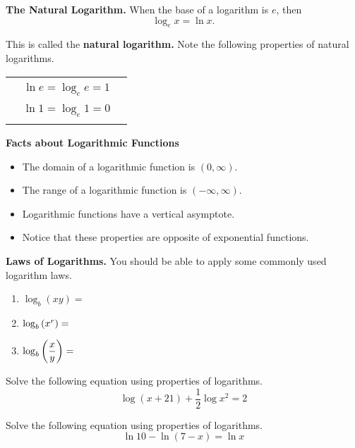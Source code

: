 \documentclass[12pt]{article}
\begin{document}
\textbf{The Natural Logarithm.} When the base of a logarithm is $e$, then
$$\log_e x=\ln x.$$

This is called the \textbf{natural logarithm.} Note the following properties of natural logarithms.

\begin{center}
\begin{tabular}{|ccc|}
\hline
& & \\
& $\ln e=\log_e e=1$ & \\
& & \\
& $\ln 1=\log_e 1=0$ & \\
& & \\
\hline
\end{tabular}
\end{center}


\vspace{5mm}

\textbf{Facts about Logarithmic Functions}
\begin{itemize}
	\item The domain of a logarithmic function is $(0,\infty)$. 
	\item The range of a logarithmic function is $(-\infty,\infty)$. 
	\item Logarithmic functions have a vertical asymptote.
	\item Notice that these properties are opposite of exponential functions.
\end{itemize}

\newpage 

\textbf{Laws of Logarithms.} You should be able to apply some commonly used logarithm laws.
\begin{enumerate}
	\item[\tc{1}] $\log_b(xy)=$
	\vspace{4mm}
	\item[\tc{2}] $\log_b\left( x^r\right)=$
	\vspace{2mm}
	\item[\tc{3}] $\log_b\displaystyle\left(\frac{x}{y}\right)=$
	\vspace{2mm}
\end{enumerate}

\Example Solve the following equation using properties of logarithms.
$$\log(x+21)+\frac{1}{2}\log x^2=2$$

\vspace{30mm}

\Example Solve the following equation using properties of logarithms.
$$\ln 10-\ln(7-x)=\ln x$$

\vspace{30mm}
\end{document}
